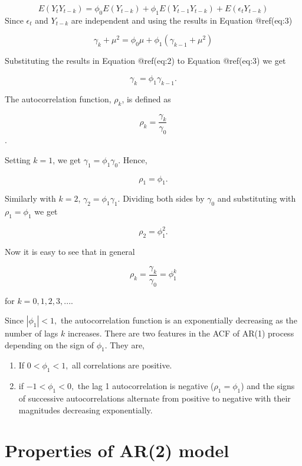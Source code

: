 \documentclass[
  11pt,
  a4paper,
]{report}
\begin{document}
\[E(Y_tY_{t-k})=\phi_0E(Y_{t-k})+\phi_1 E(Y_{t-1}Y_{t-k})+E(\epsilon_tY_{t-k})\]
Since \(\epsilon_t\) and \(Y_{t-k}\) are independent and using the
results in Equation @ref(eq:3)

\[\gamma_k + \mu^2 = \phi_0 \mu+\phi_1(\gamma_{k-1}+\mu^2)\]

Substituting the results in Equation @ref(eq:2) to Equation @ref(eq:3)
we get

\begin{equation}
\gamma_k = \phi_1 \gamma_{k-1}.
\end{equation}

The autocorrelation function, \(\rho_k\), is defined as

\[\rho_k = \frac{\gamma_k}{\gamma_0}\].

Setting \(k=1\), we get \(\gamma_1 = \phi_1\gamma_0.\) Hence,

\[\rho_1=\phi_1.\]

Similarly with \(k=2\), \(\gamma_2 = \phi_1 \gamma_1\). Dividing both
sides by \(\gamma_0\) and substituting with \(\rho_1=\phi_1\) we get

\[\rho_2=\phi_1^2.\]

Now it is easy to see that in general

\begin{equation}
\rho_k = \frac{\gamma_k}{\gamma_0}=\phi_1^k 
\end{equation}

for \(k=0, 1, 2, 3, ...\).

Since \(|\phi_1| < 1,\) the autocorrelation function is an exponentially
decreasing as the number of lags \(k\) increases. There are two features
in the ACF of AR(1) process depending on the sign of \(\phi_1\). They
are,

\begin{enumerate}
\def\labelenumi{\arabic{enumi}.}
\item
  If \(0 < \phi_1 < 1,\) all correlations are positive.
\item
  if \(-1 < \phi_1 < 0,\) the lag 1 autocorrelation is negative
  (\(\rho_1=\phi_1\)) and the signs of successive autocorrelations
  alternate from positive to negative with their magnitudes decreasing
  exponentially.
\end{enumerate}

\section{Properties of AR(2) model}\label{properties-of-ar2-model}
\end{document}
